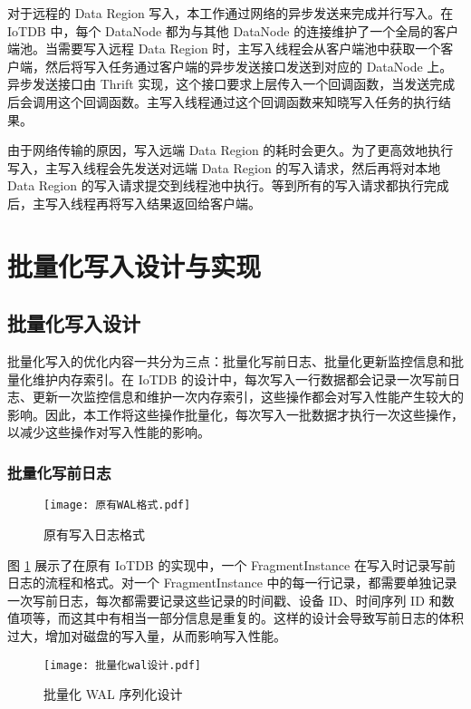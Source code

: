 对于远程的 Data Region 写入，本工作通过网络的异步发送来完成并行写入。在 IoTDB 中，每个 DataNode 都为与其他 DataNode 的连接维护了一个全局的客户端池。当需要写入远程 Data Region 时，主写入线程会从客户端池中获取一个客户端，然后将写入任务通过客户端的异步发送接口发送到对应的 DataNode 上。异步发送接口由 Thrift 实现，这个接口要求上层传入一个回调函数，当发送完成后会调用这个回调函数。主写入线程通过这个回调函数来知晓写入任务的执行结果。

由于网络传输的原因，写入远端 Data Region 的耗时会更久。为了更高效地执行写入，主写入线程会先发送对远端 Data Region 的写入请求，然后再将对本地 Data Region 的写入请求提交到线程池中执行。等到所有的写入请求都执行完成后，主写入线程再将写入结果返回给客户端。

\section{批量化写入设计与实现}
\subsection{批量化写入设计}
批量化写入的优化内容一共分为三点：批量化写前日志、批量化更新监控信息和批量化维护内存索引。在 IoTDB 的设计中，每次写入一行数据都会记录一次写前日志、更新一次监控信息和维护一次内存索引，这些操作都会对写入性能产生较大的影响。因此，本工作将这些操作批量化，每次写入一批数据才执行一次这些操作，以减少这些操作对写入性能的影响。

\subsubsection{批量化写前日志}
\begin{figure}
  \centering
  \texttt{[image: 原有WAL格式.pdf]}
  \caption{原有写入日志格式}
  \label{fig:origin-wal-format}
\end{figure}

图 \ref{fig:origin-wal-format} 展示了在原有 IoTDB 的实现中，一个 FragmentInstance 在写入时记录写前日志的流程和格式。对一个 FragmentInstance 中的每一行记录，都需要单独记录一次写前日志，每次都需要记录这些记录的时间戳、设备 ID、时间序列 ID 和数值项等，而这其中有相当一部分信息是重复的。这样的设计会导致写前日志的体积过大，增加对磁盘的写入量，从而影响写入性能。

\begin{figure}
  \centering
  \texttt{[image: 批量化wal设计.pdf]}
  \caption{批量化 WAL 序列化设计}
  \label{fig:batch-wal-design}
\end{figure}

